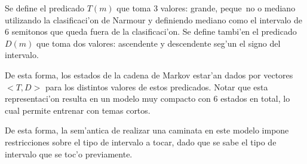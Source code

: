 Se define el predicado $T(m)$ que toma 3 valores: grande, peque~no o mediano utilizando la clasificaci'on de Narmour y definiendo mediano como el intervalo de 
6 semitonos que queda fuera de la clasificaci'on. Se define tambi'en el predicado $D(m)$ que toma dos valores: ascendente y descendente seg'un el signo del intervalo.

De esta forma, los estados de la cadena de Markov estar'an dados por vectores $<T, D>$ para los distintos valores de estos predicados. Notar que esta representaci'on
resulta en un modelo muy compacto con $6$ estados en total, lo cual permite entrenar con temas cortos.

De esta forma, la sem'antica de realizar una caminata en este modelo impone restricciones sobre el tipo de intervalo a tocar, dado que se sabe el tipo de intervalo que se 
toc'o previamente.

